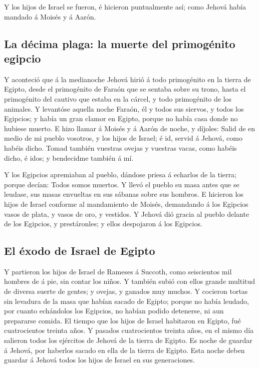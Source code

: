  Y los hijos de Israel se fueron, é hicieron puntualmente
así; como Jehová había mandado á Moisés y á Aarón.

\hypertarget{la-duxe9cima-plaga-la-muerte-del-primoguxe9nito-egipcio}{%
\subsection{La décima plaga: la muerte del primogénito
egipcio}\label{la-duxe9cima-plaga-la-muerte-del-primoguxe9nito-egipcio}}

 Y aconteció que á la medianoche Jehová hirió á todo
primogénito en la tierra de Egipto, desde el primogénito de Faraón que
se sentaba sobre su trono, hasta el primogénito del cautivo que estaba
en la cárcel, y todo primogénito de los animales.  Y
levantóse aquella noche Faraón, él y todos sus siervos, y todos los
Egipcios; y había un gran clamor en Egipto, porque no había casa donde
no hubiese muerto.  E hizo llamar á Moisés y á Aarón de
noche, y díjoles: Salid de en medio de mi pueblo vosotros, y los hijos
de Israel; é id, servid á Jehová, como habéis dicho. 
Tomad también vuestras ovejas y vuestras vacas, como habéis dicho, é
idos; y bendecidme también á mí.

 Y los Egipcios apremiaban al pueblo, dándose priesa á
echarlos de la tierra; porque decían: Todos somos muertos.
 Y llevó el pueblo su masa antes que se leudase, sus
masas envueltas en sus sábanas sobre sus hombros.  E
hicieron los hijos de Israel conforme al mandamiento de Moisés,
demandando á los Egipcios vasos de plata, y vasos de oro, y vestidos.
 Y Jehová dió gracia al pueblo delante de los Egipcios, y
prestáronles; y ellos despojaron á los Egipcios.

\hypertarget{el-uxe9xodo-de-israel-de-egipto}{%
\subsection{El éxodo de Israel de
Egipto}\label{el-uxe9xodo-de-israel-de-egipto}}

 Y partieron los hijos de Israel de Rameses á Succoth,
como seiscientos mil hombres de á pie, sin contar los niños.
 Y también subió con ellos grande multitud de diversa
suerte de gentes; y ovejas, y ganados muy muchos.  Y
cocieron tortas sin levadura de la masa que habían sacado de Egipto;
porque no había leudado, por cuanto echándolos los Egipcios, no habían
podido detenerse, ni aun prepararse comida.  El tiempo
que los hijos de Israel habitaron en Egipto, fué cuatrocientos treinta
años.  Y pasados cuatrocientos treinta años, en el mismo
día salieron todos los ejércitos de Jehová de la tierra de Egipto.
 Es noche de guardar á Jehová, por haberlos sacado en
ella de la tierra de Egipto. Esta noche deben guardar á Jehová todos los
hijos de Israel en sus generaciones.

